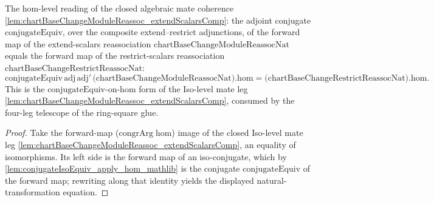 \begin{lemma}


  \label{lem:ring_square_glue_alg_leg_nat}
  The hom-level reading of the closed algebraic mate coherence
  \cref{lem:chartBaseChangeModuleReassoc_extendScalarsComp}: the adjoint conjugate
  \(\mathrm{conjugateEquiv}\), over the composite extend--restrict adjunctions, of the forward map of
  the extend-scalars reassociation \(\mathrm{chartBaseChangeModuleReassocNat}\) equals the forward map
  of the restrict-scalars reassociation \(\mathrm{chartBaseChangeRestrictReassocNat}\):
  \[
    \mathrm{conjugateEquiv}\,\mathrm{adj}\,\mathrm{adj}'\,
      \bigl(\mathrm{chartBaseChangeModuleReassocNat}\bigr).\mathrm{hom}
      = \bigl(\mathrm{chartBaseChangeRestrictReassocNat}\bigr).\mathrm{hom}.
  \]
  This is the \(\mathrm{conjugateEquiv}\)-on-\(\mathrm{hom}\) form of the Iso-level mate leg
  \cref{lem:chartBaseChangeModuleReassoc_extendScalarsComp}, consumed by the four-leg telescope of the
  ring-square glue.
  \begin{proof}
    Take the forward-map (\(\mathrm{congrArg}\;\mathrm{hom}\)) image of the closed Iso-level mate leg
    \cref{lem:chartBaseChangeModuleReassoc_extendScalarsComp}, an equality of isomorphisms. Its left
    side is the forward map of an iso-conjugate, which by
    \cref{lem:conjugateIsoEquiv_apply_hom_mathlib} is the conjugate \(\mathrm{conjugateEquiv}\) of the
    forward map; rewriting along that identity yields the displayed natural-transformation equation.
  \end{proof}
\end{lemma}


